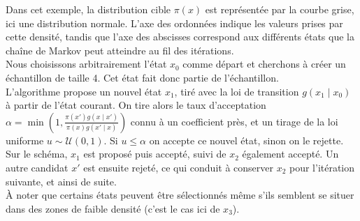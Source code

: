 \documentclass{article}
\begin{document}
\begin{tcolorbox}[colback=white,colframe=yellow!80!black,title=Exemple 1, breakable]
\begin{center}
\end{center}

Dans cet exemple, la distribution cible $\pi(x)$ est représentée par la courbe grise, ici une distribution normale. L'axe des ordonnées indique les valeurs prises par cette densité, tandis que l'axe des abscisses correspond aux différents états que la chaîne de Markov peut atteindre au fil des itérations. \\
Nous choisissons arbitrairement l'état $x_0$ comme départ et cherchons à créer un échantillon de taille 4. Cet état fait donc partie de l'échantillon. \\
L'algorithme propose un nouvel état $x_1$, tiré avec la loi de transition $g(x_1 \mid x_0)$ à partir de l'état courant. On tire alors le taux d'acceptation $\alpha = \min\left(1, \frac{\pi(x') g(x \mid x')}{\pi(x) g(x' \mid x)}\right)$ connu à un coefficient près, et un tirage de la loi uniforme $u \sim \mathcal{U}(0,1)$. 
Si $u \leqslant \alpha$ on accepte ce nouvel état, sinon on le rejette. \\
Sur le schéma, $x_1$ est proposé puis accepté, suivi de $x_2$ également accepté. Un autre candidat $x'$ est ensuite rejeté, ce qui conduit à conserver $x_2$ pour l'itération suivante, et ainsi de suite. \\
À noter que certains états peuvent être sélectionnés même s'ils semblent se situer dans des zones de faible densité (c'est le cas ici de $x_3$).
\end{tcolorbox}
\end{document}
